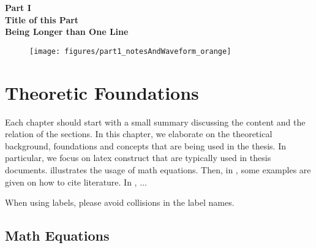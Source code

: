 \cleardoublepage
\thispagestyle{empty}
\begin{center}
\vspace*{3cm}
{\huge \bf Part I}\\ \vspace*{1cm}
{\Huge \bf Title of this Part}\\\vspace*{0.2cm}
{\Huge \bf Being Longer than One Line}\\\vspace*{3cm}
\begin{figure}[ht]
\centering
\texttt{[image: figures/part1\_notesAndWaveform\_orange]}
\end{figure}
\end{center}
\label{par:part1}
\newpage
\quad
\thispagestyle{empty}
\newpage



\chapter{Theoretic Foundations}
\label{chapter:Foundations}

Each chapter should start with a small summary discussing the content and the relation
of the sections. In this chapter, we elaborate on the theoretical background, 
foundations and concepts that are being used in the thesis. In particular, we 
focus on latex construct that are typically used in thesis documents.
 illustrates the usage of math equations.
Then, in , some examples are given on how to cite literature.
In , $\ldots$

When using labels, please avoid collisions in the label names.


\section{Math Equations}
\label{section:mathEquations}

